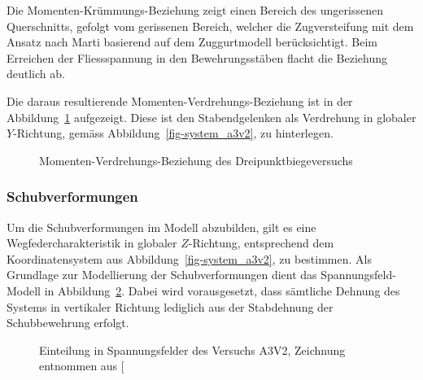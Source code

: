 \documentclass[
  11pt,
  letterpaper,
]{scrreprt}
\begin{document}
Die Momenten-Krümmungs-Beziehung zeigt einen Bereich des ungerissenen
Querschnitts, gefolgt vom gerissenen Bereich, welcher die Zugversteifung
mit dem Ansatz nach Marti basierend auf dem Zuggurtmodell
berücksichtigt. Beim Erreichen der Fliessspannung in den
Bewehrungsstäben flacht die Beziehung deutlich ab.

Die daraus resultierende Momenten-Verdrehungs-Beziehung ist in der
Abbildung~\ref{fig-mphi_a3v2} aufgezeigt. Diese ist den Stabendgelenken
als Verdrehung in globaler \(Y\)-Richtung, gemäss
Abbildung~\ref{fig-system_a3v2}, zu hinterlegen.

\begin{figure}[H]


\caption{\label{fig-mphi_a3v2}Momenten-Verdrehungs-Beziehung des
Dreipunktbiegeversuchs}

\end{figure}%

\subsubsection{Schubverformungen}\label{schubverformungen}

Um die Schubverformungen im Modell abzubilden, gilt es eine
Wegfedercharakteristik in globaler \(Z\)-Richtung, entsprechend dem
Koordinatensystem aus Abbildung~\ref{fig-system_a3v2}, zu bestimmen. Als
Grundlage zur Modellierung der Schubverformungen dient das
Spannungsfeld-Modell in Abbildung~\ref{fig-spannungsfelder_a3v2}. Dabei
wird vorausgesetzt, dass sämtliche Dehnung des Systems in vertikaler
Richtung lediglich aus der Stabdehnung der Schubbewehrung erfolgt.

\begin{figure}[H]


\caption{\label{fig-spannungsfelder_a3v2}Einteilung in Spannungsfelder
des Versuchs A3V2, Zeichnung entnommen aus
{[}\citeproc{ref-gitz_ansatze_2024}{1}{]}}

\end{figure}%
\end{document}
